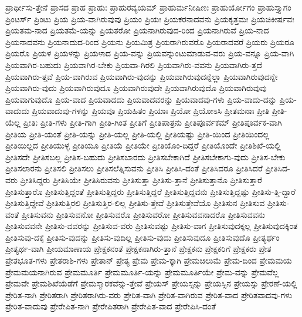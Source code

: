 {ಪ್ರಾರ್ಥೀಸು-ತ್ತೇನೆ
ಪ್ರಾಸದ
ಪ್ರಾಹ
ಪ್ರಾಹುಃ
ಪ್ರಾಹುರವ್ಯಯಮ್
ಪ್ರಾಹುರ್ಮನೀಷಿಣಃ
ಪ್ರಾಹುರ್ಯೋಗಂ
ಪ್ರಾಹುಸ್ತ್ಯಾಗಂ
ಪ್ರಿಂಟರ್ಸ್
ಪ್ರಿಂಟು
ಪ್ರಿಯ
ಪ್ರಿಯ-ವಾಗಿರುವುವು
ಪ್ರಿಯಂ
ಪ್ರಿಯಃ
ಪ್ರಿಯಕರನಾದವನು
ಪ್ರಿಯಕೃತ್ತಮಃ
ಪ್ರಿಯಚಿಕೀರ್ಷವಃ
ಪ್ರಿಯತಮ-ನಾದ
ಪ್ರಿಯತಮೆ-ಯನ್ನು
ಪ್ರಿಯತರೋ
ಪ್ರಿಯನಾಗಿರುವುದ-ರಿಂದ
ಪ್ರಿಯನಾಗಿರುವೆ
ಪ್ರಿಯ-ನಾದ
ಪ್ರಿಯನಾದವನು
ಪ್ರಿಯನಾದುದ-ರಿಂದ
ಪ್ರಿಯನು
ಪ್ರಿಯಮಿತ್ರ
ಪ್ರಿಯರಾಗಿರುವರೊ
ಪ್ರಿಯರಾದವರೆ
ಪ್ರಿಯರು
ಪ್ರಿಯರೂ
ಪ್ರಿಯರೊ
ಪ್ರಿಯಳ
ಪ್ರಿಯಳನ್ನು
ಪ್ರಿಯಳಾದ
ಪ್ರಿಯ-ವನ್ನು
ಪ್ರಿಯವನ್ನುಂಟುಮಾಡುವ-ವರು
ಪ್ರಿಯ-ವನ್ನೂ
ಪ್ರಿಯ-ವಾಗಿ
ಪ್ರಿಯವಾಗಿರ-ಬಹುದು
ಪ್ರಿಯವಾಗಿರ-ಬೇಕು
ಪ್ರಿಯವಾ-ಗಿರಲಿ
ಪ್ರಿಯವಾಗಿರು-ವವನು
ಪ್ರಿಯವಾಗಿರು-ತ್ತದೆ
ಪ್ರಿಯವಾಗಿರು-ತ್ತವೆ
ಪ್ರಿಯ-ವಾಗಿರುವ
ಪ್ರಿಯವಾಗಿರು-ವುದನ್ನು
ಪ್ರಿಯವಾಗಿರುವುದನ್ನೆಲ್ಲಾ
ಪ್ರಿಯವಾಗಿರುವುದನ್ನೇ
ಪ್ರಿಯವಾಗಿರು-ವುದು
ಪ್ರಿಯವಾಗಿರುವುದೂ
ಪ್ರಿಯವಾಗಿರುವುದೇ
ಪ್ರಿಯವಾಗಿರುವುದೊ
ಪ್ರಿಯವಾಗಿರುವುವು
ಪ್ರಿಯವಾಗುವುದೊ
ಪ್ರಿಯ-ವಾದ
ಪ್ರಿಯವಾದದು
ಪ್ರಿಯವಾದವರನ್ನು
ಪ್ರಿಯವಾದವು-ಗಳು
ಪ್ರಿಯ-ವಾದು-ದನ್ನು
ಪ್ರಿಯ-ವಾದುದು
ಪ್ರಿಯವಾದುವು-ಗಳನ್ನು
ಪ್ರಿಯವೂ
ಪ್ರಿಯಹಿತಂ
ಪ್ರಿಯಾಃ
ಪ್ರಿಯೋ
ಪ್ರಿಯೋಽಸಿ
ಪ್ರೀತಮನಾಃ
ಪ್ರೀತಿ
ಪ್ರೀತಿ-ಯೆಲ್ಲ
ಪ್ರೀತಿಃ
ಪ್ರೀತಿ-ಗಳು
ಪ್ರೀತಿ-ಗಾಗಿ
ಪ್ರೀತಿ-ಗಿಂತ
ಪ್ರೀತಿಗೆ
ಪ್ರೀತಿಪಾತ್ರನು
ಪ್ರೀತಿಪೂರ್ವಕಮ್
ಪ್ರೀತಿಪೂರ್ವಕ-ವಾಗಿ
ಪ್ರೀತಿಯ
ಪ್ರೀತಿ-ಯಂತೆ
ಪ್ರೀತಿ-ಯನ್ನು
ಪ್ರೀತಿ-ಯಲ್ಲ
ಪ್ರೀತಿ-ಯಲ್ಲಿ
ಪ್ರೀತಿಯಷ್ಟು
ಪ್ರೀತಿ-ಯಿಂದ
ಪ್ರೀತಿಯಿಂದಲ್ಲ
ಪ್ರೀತಿಯಿಲ್ಲದ
ಪ್ರೀತಿಯುಳ್ಳ
ಪ್ರೀತಿಯೂ
ಪ್ರೀತಿಯೆ
ಪ್ರೀತಿಯೇ
ಪ್ರೀತಿಯೊಂ-ದಿದ್ದರೆ
ಪ್ರೀತಿಯೊಂದೇ
ಪ್ರೀತಿಶಿಖೆ-ಯಲ್ಲಿ
ಪ್ರೀತಿಸದೇ
ಪ್ರೀತಿಸಬಲ್ಲ
ಪ್ರೀತಿಸ-ಬಹುದು
ಪ್ರೀತಿಸಬಾರದು
ಪ್ರೀತಿಸಬೇಕಾಗಿದೆ
ಪ್ರೀತಿಸಬೇಕಾಗು-ವುದು
ಪ್ರೀತಿಸ-ಬೇಕು
ಪ್ರೀತಿಸಲಾರನು
ಪ್ರೀತಿಸಲಿ
ಪ್ರೀತಿಸಲು
ಪ್ರೀತಿಸಲೆತ್ನಿಸುವನು
ಪ್ರೀತಿಸಿ
ಪ್ರೀತಿಸಿ-ದಂತೆ
ಪ್ರೀತಿಸಿದರೂ
ಪ್ರೀತಿಸಿದರೆ
ಪ್ರೀತಿಸಿದ-ವರು
ಪ್ರೀತಿಸಿದ್ದರು
ಪ್ರೀತಿಸಿಯೇ
ಪ್ರೀತಿಸಿರುವನು
ಪ್ರೀತಿಸುತ್ತಾ
ಪ್ರೀತಿಸು-ತ್ತಾನೆ
ಪ್ರೀತಿಸುತ್ತಾನೊ
ಪ್ರೀತಿಸುತ್ತಾರೆ
ಪ್ರೀತಿಸುತ್ತಾರೊ
ಪ್ರೀತಿಸುತ್ತಿದ್ದಂತೆ
ಪ್ರೀತಿಸುತ್ತಿದ್ದರು
ಪ್ರೀತಿಸುತ್ತಿದ್ದರೆ
ಪ್ರೀತಿಸುತ್ತಿದ್ದವನು
ಪ್ರೀತಿಸುತ್ತಿದ್ದಷ್ಟು
ಪ್ರೀತಿಸು-ತ್ತಿ-ದ್ದಾರೆ
ಪ್ರೀತಿಸುತ್ತಿದ್ದೇವೆ
ಪ್ರೀತಿಸುತ್ತಿರಲಿ
ಪ್ರೀತಿಸುತ್ತಿರ-ಲಿಲ್ಲ
ಪ್ರೀತಿಸು-ತ್ತೇವೆ
ಪ್ರೀತಿಸುತ್ತೇವೆಯೊ
ಪ್ರೀತಿಸುನ
ಪ್ರೀತಿಸುವ
ಪ್ರೀತಿಸು-ವಂತೆ
ಪ್ರೀತಿಸುವನು
ಪ್ರೀತಿಸುವನೋ
ಪ್ರೀತಿಸುವರೊ
ಪ್ರೀತಿಸುವರೋ
ಪ್ರೀತಿಸುವವನಾದರೊ
ಪ್ರೀತಿಸುವವನು
ಪ್ರೀತಿಸುವವನೇ
ಪ್ರೀತಿಸು-ವವರನ್ನು
ಪ್ರೀತಿಸುವ-ವರು
ಪ್ರೀತಿಸುವಷ್ಟು
ಪ್ರೀತಿಸು-ವಾಗ
ಪ್ರೀತಿಸುವುದಕ್ಕಲ್ಲ
ಪ್ರೀತಿಸುವುದಕ್ಕಿಂತ
ಪ್ರೀತಿಸುವು-ದಕ್ಕೆ
ಪ್ರೀತಿಸು-ವುದನ್ನು
ಪ್ರೀತಿಸು-ವುದಿಲ್ಲ
ಪ್ರೀತಿಸು-ವುದು
ಪ್ರೀತಿಸುವುದೂ
ಪ್ರೀತಿಸುವುದೊ
ಪ್ರೀತ್ಯರ್ಥಂ
ಪ್ರೀತ್ಯರ್ಥ-ವಾಗಿ
ಪ್ರೀಯಮಾಣಾಯ
ಪ್ರೇಕ್ಷಕನಂತೆ
ಪ್ರೇಕ್ಷಕನಾಗಿರು-ತ್ತಾನೆ
ಪ್ರೇಕ್ಷಕನು
ಪ್ರೇಕ್ಷಕರಿಗೆ
ಪ್ರೇಕ್ಷಕರು
ಪ್ರೇತ
ಪ್ರೇತಭೂತ-ಗಳು
ಪ್ರೇತರಾಶಿ-ಗಳು
ಪ್ರೇತಾನ್
ಪ್ರೇತ್ಯ
ಪ್ರೇಮ
ಪ್ರೇಮ-ಕ್ಕಾಗಿ
ಪ್ರೇಮಚಿಲುಮೆ
ಪ್ರೇಮ-ದಿಂದ
ಪ್ರೇಮಮಯ
ಪ್ರೇಮಮಯನಾಗಿರುವ
ಪ್ರೇಮಮೂರ್ತಿ
ಪ್ರೇಮಮೂರ್ತಿ-ಯನ್ನು
ಪ್ರೇಮಮೂರ್ತಿಯೇ
ಪ್ರೇಮ-ವನ್ನು
ಪ್ರೇಮವೆಲ್ಲ
ಪ್ರೇಮವೇ
ಪ್ರೇಮಶಿಖೆಯೆಡೆಗೆ
ಪ್ರೇಮಸ್ಮಾರಕವೆನ್ನು-ತ್ತೇವೆ
ಪ್ರೇಯಸ್
ಪ್ರೇಯಸ್ಸನ್ನು
ಪ್ರೇಯಸ್ಸಿನ
ಪ್ರೇಯಸ್ಸು
ಪ್ರೇರಣೆ-ಯಲ್ಲಿ
ಪ್ರೇರಿತ-ನಾಗಿ
ಪ್ರೇರಿತರಾಗಿ
ಪ್ರೇರಿತರಾಗಿರು-ವರು
ಪ್ರೇರಿತ-ವಾಗಿ
ಪ್ರೇರಿತ-ವಾಗಿರುವ
ಪ್ರೇರಿತ-ವಾದ
ಪ್ರೇರಿತವಾದವು-ಗಳು
ಪ್ರೇರಿತ-ವಾದುವು
ಪ್ರೇರೇಪಿತ-ನಾಗಿ
ಪ್ರೇರೇಪಿತರಾಗಿ
ಪ್ರೇರೇಪಿತ-ವಾದ
ಪ್ರೇರೇಪಿಸಿ-ದಂತೆ
}
